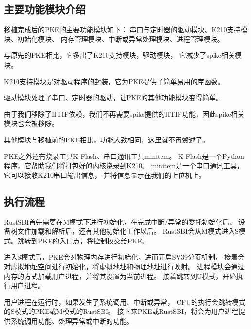 \subsection{主要功能模块介绍}

移植完成后的PKE的主要功能模块如下：
串口与定时器的驱动模块、K210支持模块、初始化模块、
内存管理模块、中断或异常处理模块、进程管理模块。

与原先的PKE相比，它多出了K210支持模块，驱动模块，
它减少了spike相关模块。

K210支持模块是对驱动程序的封装，它为PKE提供了简单易用的库函数。

驱动模块处理了串口、定时器的驱动，让PKE的其他功能模块变得简单。

由于我们移除了HTIF依赖，我们不再需要spike提供的HTIF功能，因此spike相关模块也会被移除。

其他模块与移植前的PKE相比，功能大致相同，这里就不再赘述了。

PKE之外还有烧录工具K-Flash、串口通讯工具minitem。
K-Flash是一个Python程序，它帮助我们将打包好的内核烧录到K210。\cite{2002Flash}
minitem是一个串口通讯工具，它可以接收K210串口输出信息，
并将信息显示在我们的上位机上。


\subsection{执行流程}



RustSBI首先需要在M模式下进行初始化，在完成中断/异常的委托初始化后、
设备树文件加载和解析后，还有其他初始化工作以后。
RustSBI会从M模式进入S模式。跳转到PKE的入口点，将控制权交给PKE。

进入S模式后，PKE会对物理内存进行初始化，进而开启SV39分页机制，
接着会对虚拟地址空间进行初始化，将虚拟地址和物理地址进行映射。
进程模块会通过内存的方式加载用户进程，并将其设置为当前进程。
接着跳转到U模式，开始执行用户进程。

用户进程在运行时，如果发生了系统调用、中断或异常，
CPU的执行会跳转模式的S模式的PKE或M模式的RustSBI。
接下来PKE或RustSBI，将会为用户进程提供系统调用功能、处理异常或中断的功能。